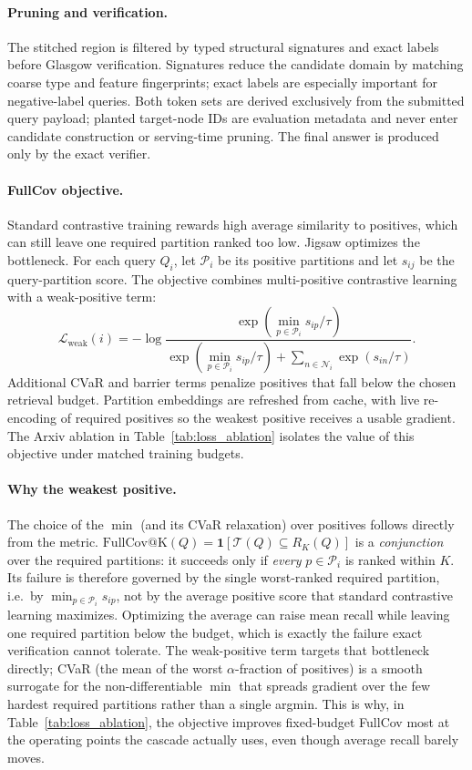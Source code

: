 \documentclass[runningheads]{llncs}
\begin{document}
\paragraph{Pruning and verification.}
The stitched region is filtered by typed structural signatures and exact labels before Glasgow verification. Signatures reduce the candidate domain by matching coarse type and feature fingerprints; exact labels are especially important for negative-label queries. Both token sets are derived exclusively from the submitted query payload; planted target-node IDs are evaluation metadata and never enter candidate construction or serving-time pruning. The final answer is produced only by the exact verifier.

\paragraph{FullCov objective.}
Standard contrastive training rewards high average similarity to positives, which can still leave one required partition ranked too low. Jigsaw optimizes the bottleneck. For each query $Q_i$, let $\mathcal{P}_i$ be its positive partitions and let $s_{ij}$ be the query-partition score. The objective combines multi-positive contrastive learning with a weak-positive term:
\begin{equation}
\mathcal{L}_{\mathrm{weak}}(i)=-\log
\frac{\exp(\min_{p\in\mathcal{P}_i}s_{ip}/\tau)}
{\exp(\min_{p\in\mathcal{P}_i}s_{ip}/\tau)+\sum_{n\in\mathcal{N}_i}\exp(s_{in}/\tau)}.
\end{equation}
Additional CVaR and barrier terms penalize positives that fall below the chosen retrieval budget. Partition embeddings are refreshed from cache, with live re-encoding of required positives so the weakest positive receives a usable gradient. The Arxiv ablation in Table~\ref{tab:loss_ablation} isolates the value of this objective under matched training budgets.

\paragraph{Why the weakest positive.}
The choice of the $\min$ (and its CVaR relaxation) over positives follows directly from the metric. $\mathrm{FullCov@K}(Q)=\mathbf{1}[\mathcal{T}(Q)\subseteq R_K(Q)]$ is a \emph{conjunction} over the required partitions: it succeeds only if \emph{every} $p\in\mathcal{P}_i$ is ranked within $K$. Its failure is therefore governed by the single worst-ranked required partition, i.e.\ by $\min_{p\in\mathcal{P}_i} s_{ip}$, not by the average positive score that standard contrastive learning maximizes. Optimizing the average can raise mean recall while leaving one required partition below the budget, which is exactly the failure exact verification cannot tolerate. The weak-positive term targets that bottleneck directly; CVaR (the mean of the worst $\alpha$-fraction of positives) is a smooth surrogate for the non-differentiable $\min$ that spreads gradient over the few hardest required partitions rather than a single argmin. This is why, in Table~\ref{tab:loss_ablation}, the objective improves fixed-budget FullCov most at the operating points the cascade actually uses, even though average recall barely moves.
\end{document}
